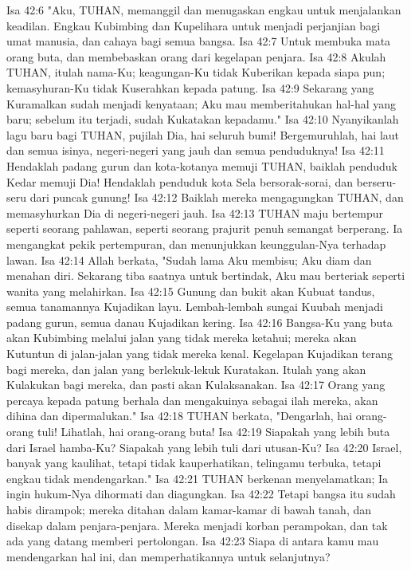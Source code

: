 Isa 42:6  "Aku, TUHAN, memanggil dan menugaskan engkau untuk menjalankan keadilan. Engkau Kubimbing dan Kupelihara untuk menjadi perjanjian bagi umat manusia, dan cahaya bagi semua bangsa.
Isa 42:7  Untuk membuka mata orang buta, dan membebaskan orang dari kegelapan penjara.
Isa 42:8  Akulah TUHAN, itulah nama-Ku; keagungan-Ku tidak Kuberikan kepada siapa pun; kemasyhuran-Ku tidak Kuserahkan kepada patung.
Isa 42:9  Sekarang yang Kuramalkan sudah menjadi kenyataan; Aku mau memberitahukan hal-hal yang baru; sebelum itu terjadi, sudah Kukatakan kepadamu."
Isa 42:10  Nyanyikanlah lagu baru bagi TUHAN, pujilah Dia, hai seluruh bumi! Bergemuruhlah, hai laut dan semua isinya, negeri-negeri yang jauh dan semua penduduknya!
Isa 42:11  Hendaklah padang gurun dan kota-kotanya memuji TUHAN, baiklah penduduk Kedar memuji Dia! Hendaklah penduduk kota Sela bersorak-sorai, dan berseru-seru dari puncak gunung!
Isa 42:12  Baiklah mereka mengagungkan TUHAN, dan memasyhurkan Dia di negeri-negeri jauh.
Isa 42:13  TUHAN maju bertempur seperti seorang pahlawan, seperti seorang prajurit penuh semangat berperang. Ia mengangkat pekik pertempuran, dan menunjukkan keunggulan-Nya terhadap lawan.
Isa 42:14  Allah berkata, "Sudah lama Aku membisu; Aku diam dan menahan diri. Sekarang tiba saatnya untuk bertindak, Aku mau berteriak seperti wanita yang melahirkan.
Isa 42:15  Gunung dan bukit akan Kubuat tandus, semua tanamannya Kujadikan layu. Lembah-lembah sungai Kuubah menjadi padang gurun, semua danau Kujadikan kering.
Isa 42:16  Bangsa-Ku yang buta akan Kubimbing melalui jalan yang tidak mereka ketahui; mereka akan Kutuntun di jalan-jalan yang tidak mereka kenal. Kegelapan Kujadikan terang bagi mereka, dan jalan yang berlekuk-lekuk Kuratakan. Itulah yang akan Kulakukan bagi mereka, dan pasti akan Kulaksanakan.
Isa 42:17  Orang yang percaya kepada patung berhala dan mengakuinya sebagai ilah mereka, akan dihina dan dipermalukan."
Isa 42:18  TUHAN berkata, "Dengarlah, hai orang-orang tuli! Lihatlah, hai orang-orang buta!
Isa 42:19  Siapakah yang lebih buta dari Israel hamba-Ku? Siapakah yang lebih tuli dari utusan-Ku?
Isa 42:20  Israel, banyak yang kaulihat, tetapi tidak kauperhatikan, telingamu terbuka, tetapi engkau tidak mendengarkan."
Isa 42:21  TUHAN berkenan menyelamatkan; Ia ingin hukum-Nya dihormati dan diagungkan.
Isa 42:22  Tetapi bangsa itu sudah habis dirampok; mereka ditahan dalam kamar-kamar di bawah tanah, dan disekap dalam penjara-penjara. Mereka menjadi korban perampokan, dan tak ada yang datang memberi pertolongan.
Isa 42:23  Siapa di antara kamu mau mendengarkan hal ini, dan memperhatikannya untuk selanjutnya?
